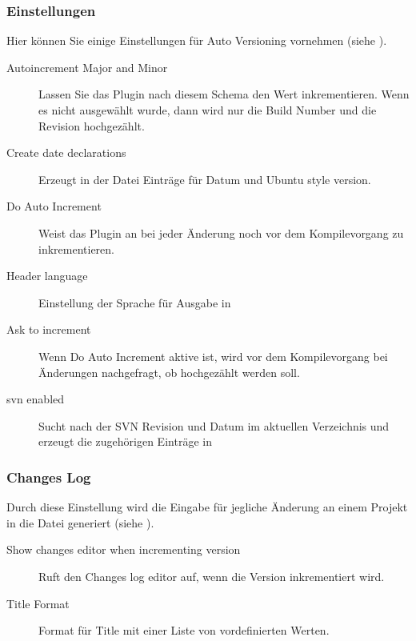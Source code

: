 \subsubsection{Einstellungen}

Hier können Sie einige Einstellungen für Auto Versioning vornehmen (siehe ).


\begin{description}
\item[Autoincrement Major and Minor] Lassen Sie das Plugin nach diesem Schema den Wert inkrementieren. Wenn es nicht ausgewählt wurde, dann wird nur die Build Number und die Revision hochgezählt.
\item[Create date declarations] Erzeugt in der Datei  Einträge für Datum und Ubuntu style version.
\item[Do Auto Increment] Weist das Plugin an bei jeder Änderung noch vor dem Kompilevorgang zu inkrementieren.
\item[Header language] Einstellung der Sprache für Ausgabe in 
\item[Ask to increment] Wenn Do Auto Increment aktive ist, wird vor dem Kompilevorgang bei Änderungen nachgefragt, ob hochgezählt werden soll.
\item[svn enabled] Sucht nach der SVN Revision und Datum im aktuellen Verzeichnis und erzeugt die zugehörigen Einträge in 
\end{description}

\subsubsection{Changes Log}

Durch diese Einstellung wird die Eingabe für jegliche Änderung an einem Projekt in die Datei  generiert (siehe ).


\begin{description}
\item[Show changes editor when incrementing version] Ruft den Changes log editor auf, wenn die Version inkrementiert wird.
\item[Title Format] Format für Title mit einer Liste von vordefinierten Werten.
\end{description}

